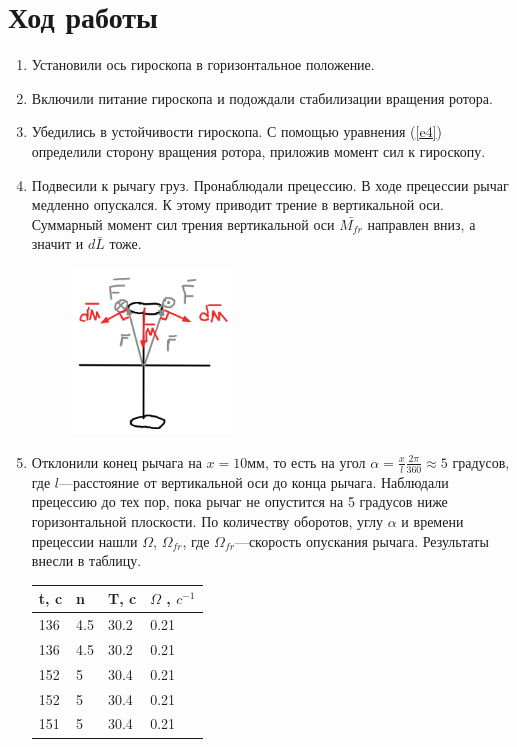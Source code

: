 \documentclass[a4paper, 12pt]{article}
\begin{document}
\section*{Ход работы}
\begin{enumerate}
    \item Установили ось гироскопа в горизонтальное положение.
    \item Включили питание гироскопа и подождали стабилизации вращения ротора.
    \item Убедились в устойчивости гироскопа. С помощью уравнения (\ref{e4}) определили сторону вращения ротора, приложив момент сил к гироскопу.
    \item
    Подвесили к рычагу груз. Пронаблюдали прецессию. В ходе прецессии рычаг медленно опускался. К этому приводит трение в вертикальной оси. Суммарный момент сил трения вертикальной оси $\bar{M_{fr}}$ направлен вниз, а значит и $d\bar{L}$ тоже.
    \begin{figure}[h]
    \includegraphics[width=120pt]{image/mfr.png}
    \end{figure}
    \item Отклонили конец рычага на $x=10\text{мм}$, то есть на угол $\alpha=\frac{x}{l}\frac{2\pi}{360}\approx 5 $ градусов, где $l$---расстояние от вертикальной оси до конца рычага. Наблюдали прецессию до тех пор, пока рычаг не опустится на 5 градусов ниже горизонтальной плоскости. По количеству оборотов, углу $\alpha$ и времени прецессии нашли $\Omega$, $\Omega_{fr}$, где $\Omega_{fr}$---скорость опускания рычага. Результаты внесли в таблицу.
    \begin{table}[h]
    \centering
    \begin{tabular}{|l|lll|}
    \hline
    t, c & n & T, c & $\Omega$ , $c^{-1}$ \\ \hline
    136 & 4.5 & 30.2 & 0.21 \\ 
    136 & 4.5 & 30.2 & 0.21 \\ 
    152 & 5 & 30.4 & 0.21 \\ 
    152 & 5 & 30.4 & 0.21 \\ 
    151 & 5 & 30.4 & 0.21 \\ \hline

\end{tabular}
\end{table}
\end{enumerate}
\end{document}
